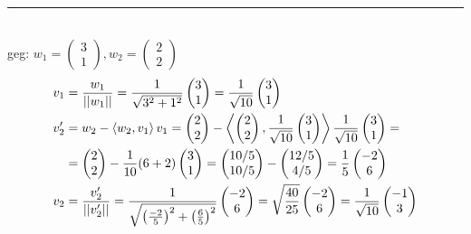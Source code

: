 \documentclass{article}
\newcommand{\lr}[1]{\left(#1\right)}
\begin{document}
{\color{blue}
\hrule
	\\
	geg: $w_1 = 
	\begin{pmatrix}
		3\\1
	\end{pmatrix}
	, w_2 = 
	\begin{pmatrix}
		2\\2
	\end{pmatrix}$
	\begin{align*}
		v_1 &= \frac{w_1}{||w_1||} = \frac{1}{\sqrt{3^2+1^2}}
		\begin{pmatrix}
			3\\1
		\end{pmatrix}
		=
		\frac{1}{\sqrt{10}}
		\begin{pmatrix}
			3\\1
		\end{pmatrix}\\
		v_2' &= w_2 - \braket{w_2,v_1}v_1 
		=
		\begin{pmatrix}
			2\\2
		\end{pmatrix}
		-
		\left\langle
		\begin{pmatrix}
			2\\2
		\end{pmatrix}
		,
		\frac{1}{\sqrt{10}}
		\begin{pmatrix}
			3\\1
		\end{pmatrix}
		\right\rangle
		\frac{1}{\sqrt{10}}
		\begin{pmatrix}
			3\\1
		\end{pmatrix}
		=\\
		&=
		\begin{pmatrix}
			2\\2
		\end{pmatrix}
		-
		\frac{1}{10}
		(6+2)
		\begin{pmatrix}
			3\\1
		\end{pmatrix}
		=
		\begin{pmatrix}
			10/5\\10/5
		\end{pmatrix}
		-
		\begin{pmatrix}
			12/5\\4/5
		\end{pmatrix}
		=
		\frac{1}{5}
		\begin{pmatrix}
			-2\\6
		\end{pmatrix}\\
		v_2 &= \frac{v_2'}{||v_2'||} = \frac{1}{\sqrt{ \lr{\frac{-2}{5}}^2 + \lr{\frac{6}{5}}^2 }}
		\begin{pmatrix}
			-2\\6
		\end{pmatrix}
		=
		\sqrt{\frac{40}{25}}
		\begin{pmatrix}
			-2\\6
		\end{pmatrix}
		=
		\frac{1}{\sqrt{10}}
		\begin{pmatrix}
			-1\\3
		\end{pmatrix}
	\end{align*}

}
\end{document}
